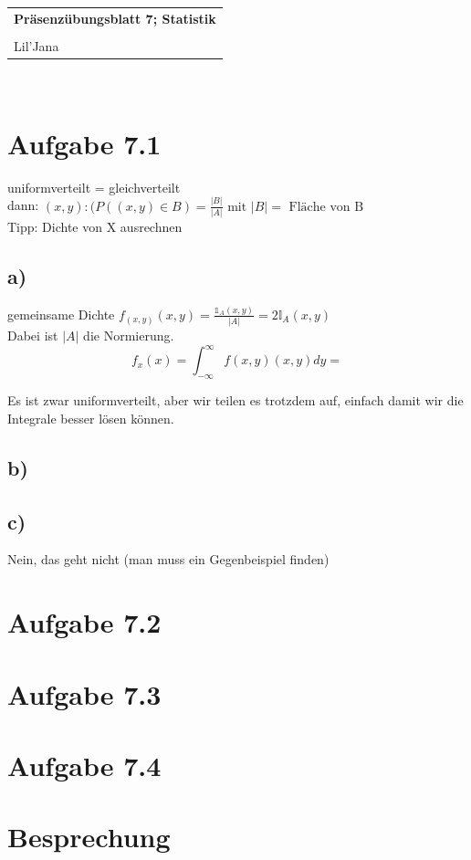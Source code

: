 \documentclass{article} %
\newcommand{\titulo}{Präsenzübungsblatt 7; Statistik}
\newcommand{\nombre}{Lil'Jana}
\begin{document}
\begin{tabular}{p{12cm}}
{{\Large\bf\titulo}}\\
\vspace{0.2cm}\\
 {\large\nombre}\\
\end{tabular}
\vspace{0.2cm}\\
\section{Aufgabe 7.1}
uniformverteilt = gleichverteilt \\
dann: \(
(x,y) : (P((x,y)\in B) = \frac{|B|}{|A|} \text{ mit } |B| = \text{ Fläche von B}
\)\\
Tipp: Dichte von X ausrechnen 
\subsection{a)} gemeinsame Dichte $f_{(x,y)}(x,y) = \frac{\mathbb{1}_A(x,y)}{|A|} = 2 \mathbb{I}_A(x,y)$ \\
Dabei ist $|A|$ die Normierung. 
\[
f_x (x) = \int_{-\infty}^{\infty} f{(x,y)}(x,y) dy = 
\]

Es ist zwar uniformverteilt, aber wir teilen es trotzdem auf, einfach damit wir die Integrale besser lösen können. 
\subsection{b)} 

\subsection{c)} Nein, das geht nicht (man muss ein Gegenbeispiel finden) 

\section{Aufgabe 7.2}

\section{Aufgabe 7.3}

\section{Aufgabe 7.4}

\section{Besprechung}
\end{document}

